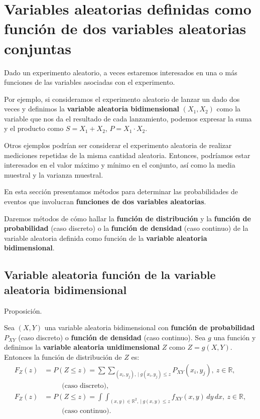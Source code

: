 \documentclass[]{book}
\begin{document}
\hypertarget{variables-aleatorias-definidas-como-funciuxf3n-de-dos-variables-aleatorias-conjuntas}{%
\section{Variables aleatorias definidas como función de dos variables aleatorias conjuntas}\label{variables-aleatorias-definidas-como-funciuxf3n-de-dos-variables-aleatorias-conjuntas}}

Dado un experimento aleatorio, a veces estaremos interesados en una o más funciones de las variables asociadas con el experimento.

Por ejemplo, si consideramos el experimento aleatorio de lanzar un dado dos veces y definimos la \textbf{variable aleatoria bidimensional} \((X_1,X_2)\) como la variable que nos da el resultado de cada lanzamiento, podemos expresar la suma y el producto como \(S=X_1+X_2\), \(P=X_1\cdot X_2\).

Otros ejemplos podrían ser considerar el experimento aleatoria de realizar mediciones repetidas de la misma cantidad aleatoria. Entonces, podríamos estar interesados en el valor máximo y mínimo en el conjunto, así como la media muestral y la varianza muestral.

En esta sección presentamos métodos para determinar las probabilidades de eventos que involucran \textbf{funciones de dos variables aleatorias}.

Daremos métodos de cómo hallar la \textbf{función de distribución} y la \textbf{función de probabilidad} (caso discreto) o la \textbf{función de densidad} (caso continuo) de la variable aleatoria definida como función de la \textbf{variable aleatoria bidimensional}.

\hypertarget{variable-aleatoria-funciuxf3n-de-la-variable-aleatoria-bidimensional}{%
\subsection{Variable aleatoria función de la variable aleatoria bidimensional}\label{variable-aleatoria-funciuxf3n-de-la-variable-aleatoria-bidimensional}}

Proposición.

Sea \((X,Y)\) una variable aleatoria bidimensional con \textbf{función de probabilidad} \(P_{XY}\) (caso discreto) o \textbf{función de densidad} (caso continuo). Sea \(g\) una función y definimos la \textbf{variable aleatoria unidimensional} \(Z\) como \(Z=g(X,Y)\). Entonces la función de distribución de \(Z\) es:
\[
\begin{array}{rl}
F_Z(z) & = \displaystyle P(Z\leq z)=\sum\sum_{(x_i,y_j),\ |\ g(x_i,y_j)\leq z} P_{XY}(x_i,y_j),\ z\in\mathbb{R},\\ &\ \qquad\mbox{ (caso discreto),}\\
F_Z(z) & = \displaystyle  P(Z\leq z)=\int\int_{(x,y)\in\mathbb{R}^2,\ |\ g(x,y)\leq z} f_{XY}(x,y)\,dy\, dx, \ z\in\mathbb{R},\\ &\ \qquad\mbox{ (caso continuo).}
\end{array}
\]
\end{document}
